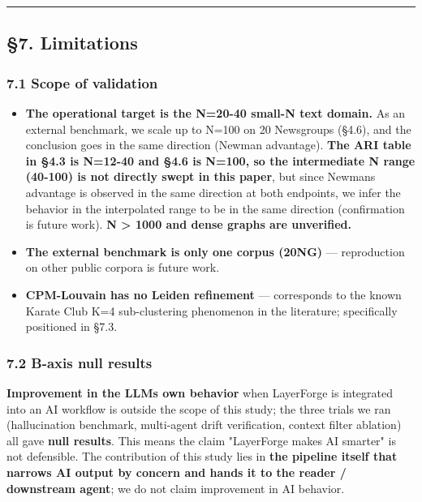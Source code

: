 \documentclass[
]{article}
\providecommand{\tightlist}{%
  \setlength{\itemsep}{0pt}\setlength{\parskip}{0pt}}
\begin{document}
\begin{center}\rule{0.5\linewidth}{0.5pt}\end{center}

\subsection{§7. Limitations}\label{7-limitations}

\subsubsection{7.1 Scope of validation}\label{71-scope-of-validation}

\begin{itemize}
\tightlist
\item
  \textbf{The operational target is the N=20-40 small-N text domain.} As
  an external benchmark, we scale up to N=100 on 20 Newsgroups (§4.6),
  and the conclusion goes in the same direction (Newman advantage).
  \textbf{The ARI table in §4.3 is N=12-40 and §4.6 is N=100, so the
  intermediate N range (40-100) is not directly swept in this paper},
  but since Newman\textquotesingle s advantage is observed in the same
  direction at both endpoints, we infer the behavior in the interpolated
  range to be in the same direction (confirmation is future work).
  \textbf{N \textgreater{} 1000 and dense graphs are unverified.}
\item
  \textbf{The external benchmark is only one corpus (20NG)} ---
  reproduction on other public corpora is future work.
\item
  \textbf{CPM-Louvain has no Leiden refinement} --- corresponds to the
  known Karate Club K=4 sub-clustering phenomenon in the literature;
  specifically positioned in §7.3.
\end{itemize}

\subsubsection{7.2 B-axis null results}\label{72-b-axis-null-results}

\textbf{Improvement in the LLM\textquotesingle s own behavior} when
LayerForge is integrated into an AI workflow is outside the scope of
this study; the three trials we ran (hallucination benchmark,
multi-agent drift verification, context filter ablation) all gave
\textbf{null results}. This means the claim "LayerForge makes AI
smarter" is not defensible. The contribution of this study lies in
\textbf{the pipeline itself that narrows AI output by concern and hands
it to the reader / downstream agent}; we do not claim improvement in AI
behavior.
\end{document}
